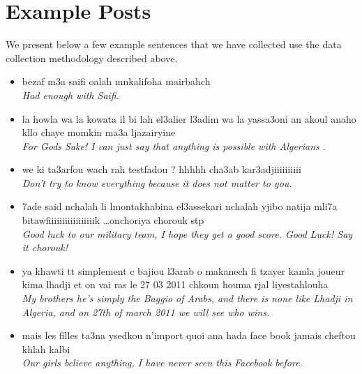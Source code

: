 \documentclass[10pt, a4paper]{article}
\begin{document}
		

\section{Example Posts} We present below a few example sentences that
we have collected use the data collection methodology described above.
\begin{itemize}
  \item bezaf m3a saifi oalah mnkalifoha mairbahch\\
  {\it Had enough with Saifi.}
   \item la howla wa la kowata il bi lah el3alier l3adim wa la
yassa3oni an akoul anaho kllo chaye momkin ma3a ljazairyine\\ 
{\it For Gods Sake! I can just say that anything is possible with Algerians .}
   \item we ki ta3arfou wach rah testfadou ? hhhhh cha3ab
kar3adjiiiiiiiiii\\ 
{\it Don't try to know everything because it does not matter to you.}
   \item 7ade said nchalah li lmontakhabina el3assekari nchalah yjibo
natija mli7a bitawfiiiiiiiiiiiiiiiiik \ldots onchoriya chorouk
stp\\
{\it Good luck to our military team, I hope they get a good
score. Good Luck! Say it chorouk!}
   \item ya khawti tt simplement c bajiou l3arab o makanech fi tzayer
kamla joueur kima lhadji et on vai ras le 27 03 2011 chkoun houma rjal
liyestahlouha\\
{\it My brothers he's simply the Baggio of Arabs, and there
is none like Lhadji in Algeria, and on 27th of march 2011 we will see
who wins.}
   \item mais les filles ta3na ysedkou n'import quoi ana hada face
book jamais cheftou khlah kalbi\\
{\it Our girls believe anything, I have never seen this Facebook before.}
\end{itemize}
\end{document}
